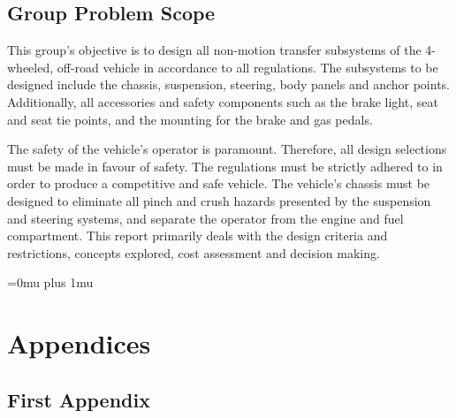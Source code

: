 \documentclass[12pt,twoside]{article}
\begin{document}
    \subsection{Group Problem Scope}
    This group's objective is to design all non-motion transfer subsystems of the 4-wheeled, off-road vehicle in accordance to all regulations. The subsystems to be designed include the chassis, suspension, steering, body panels and anchor points. Additionally, all accessories and safety components such as the brake light, seat and seat tie points, and the mounting for the brake and gas pedals.
    
    The safety of the vehicle's operator is paramount. Therefore, all design selections must be made in favour of safety. The regulations must be strictly adhered to in order to produce a competitive and safe vehicle. The vehicle's chassis must be designed to eliminate all pinch and crush hazards presented by the suspension and steering systems, and separate the operator from the engine and fuel compartment. This report primarily deals with the design criteria and restrictions, concepts explored, cost assessment and decision making.
    
    \newpage\null\thispagestyle{empty}\newpage


    \newpage
    \Urlmuskip=0mu plus 1mu\relax
    
    
    \newpage
       	


    \appendix
    \thispagestyle{plain}
    \renewcommand{\thesubsection}{\Alph{subsection}}
        		
    \section*{Appendices}
    \subsection{First Appendix}

    
\end{document}
